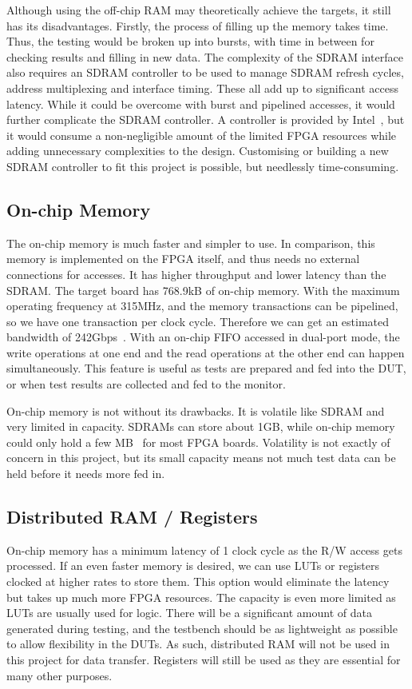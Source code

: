 Although using the off-chip RAM may theoretically achieve the targets, it still has its disadvantages.
Firstly, the process of filling up the memory takes time.
Thus, the testing would be broken up into bursts, with time in between for checking results and filling in new data.
The complexity of the SDRAM interface also requires an SDRAM controller to be used to manage SDRAM refresh cycles, address multiplexing and interface timing.
These all add up to significant access latency.
While it could be overcome with burst and pipelined accesses, it would further complicate the SDRAM controller.
A controller is provided by Intel~\cite{Altera3}, but it would consume a non-negligible amount of the limited FPGA resources while adding unnecessary complexities to the design.
Customising or building a new SDRAM controller to fit this project is possible, but needlessly time-consuming.

\subsection{On-chip Memory}
The on-chip memory is much faster and simpler to use.
In comparison, this memory is implemented on the FPGA itself, and thus needs no external connections for accesses.
It has higher throughput and lower latency than the SDRAM.
The target board has 768.9kB of on-chip memory.
With the maximum operating frequency at 315MHz, and the memory transactions can be pipelined, so we have one transaction per clock cycle.
Therefore we can get an estimated bandwidth of 242Gbps~\cite{Intel4}.
With an on-chip FIFO accessed in dual-port mode, the write operations at one end and the read operations at the other end can happen simultaneously.
This feature is useful as tests are prepared and fed into the DUT, or when test results are collected and fed to the monitor.

On-chip memory is not without its drawbacks.
It is volatile like SDRAM and very limited in capacity.
SDRAMs can store about 1GB, while on-chip memory could only hold a few MB~\cite{Altera2} for most FPGA boards.
Volatility is not exactly of concern in this project, but its small capacity means not much test data can be held before it needs more fed in.

\subsection{Distributed RAM / Registers}
On-chip memory has a minimum latency of 1 clock cycle as the R/W access gets processed.
If an even faster memory is desired, we can use LUTs or registers clocked at higher rates to store them.
This option would eliminate the latency but takes up much more FPGA resources.
The capacity is even more limited as LUTs are usually used for logic.
There will be a significant amount of data generated during testing, and the testbench should be as lightweight as possible to allow flexibility in the DUTs.
As such, distributed RAM will not be used in this project for data transfer.
Registers will still be used as they are essential for many other purposes.


